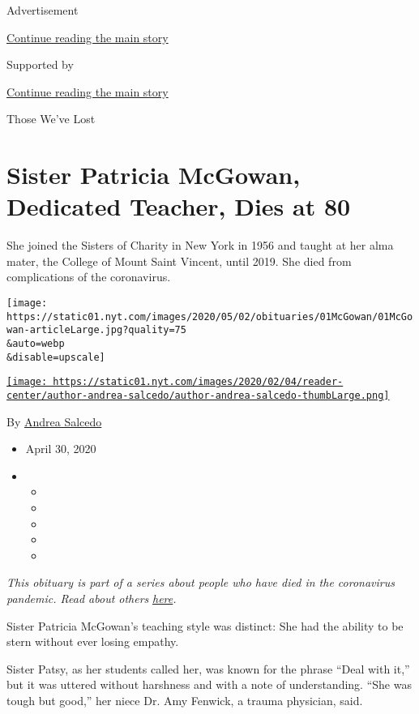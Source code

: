 Advertisement

\protect\hyperlink{after-top}{Continue reading the main story}

Supported by

\protect\hyperlink{after-sponsor}{Continue reading the main story}

Those We've Lost

\hypertarget{sister-patricia-mcgowan-dedicated-teacher-dies-at-80}{%
\section{Sister Patricia McGowan, Dedicated Teacher, Dies at
80}\label{sister-patricia-mcgowan-dedicated-teacher-dies-at-80}}

She joined the Sisters of Charity in New York in 1956 and taught at her
alma mater, the College of Mount Saint Vincent, until 2019. She died
from complications of the coronavirus.

\texttt{[image: https://static01.nyt.com/images/2020/05/02/obituaries/01McGowan/01McGowan-articleLarge.jpg?quality=75\\\&auto=webp\\\&disable=upscale]}

\href{https://www.nytimes.com/by/andrea-salcedo}{\texttt{[image: https://static01.nyt.com/images/2020/02/04/reader-center/author-andrea-salcedo/author-andrea-salcedo-thumbLarge.png]}}

By \href{https://www.nytimes.com/by/andrea-salcedo}{Andrea Salcedo}

\begin{itemize}
\item
  April 30, 2020
\item
  \begin{itemize}
  \item
  \item
  \item
  \item
  \item
  \end{itemize}
\end{itemize}

\emph{This obituary is part of a series about people who have died in
the coronavirus pandemic. Read about others}
\href{https://www.nytimes.com/series/people-who-have-died-of-the-coronavirus}{\emph{here}}\emph{.}

Sister Patricia McGowan's teaching style was distinct: She had the
ability to be stern without ever losing empathy.

Sister Patsy, as her students called her, was known for the phrase
``Deal with it,'' but it was uttered without harshness and with a note
of understanding. ``She was tough but good,'' her niece Dr. Amy Fenwick,
a trauma physician, said.

